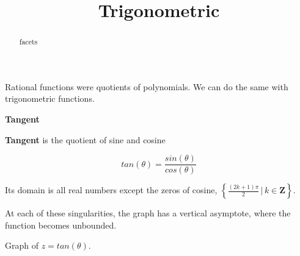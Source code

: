 \documentclass{ximera}
\title{Trigonometric}
\begin{document}
\begin{abstract}
facets
\end{abstract}
\maketitle




Rational functions were quotients of polynomials.  We can do the same with trigonometric functions.


\begin{definition}  \textbf{\textcolor{green!50!black}{Tangent}} 


\textbf{Tangent} is the quotient of sine and cosine


\[   tan(\theta) = \frac{sin(\theta)}{cos(\theta)}      \]



Its domain is all real numbers except the zeros of cosine, $\left\{  \frac{(2k+1)\pi}{2}   \, | \,   k \in \textbf{Z}   \right\}$.

\end{definition}


At each of these singularities, the graph has a vertical asymptote, where the function becomes unbounded.




Graph of $z = tan(\theta)$.
\end{document}
